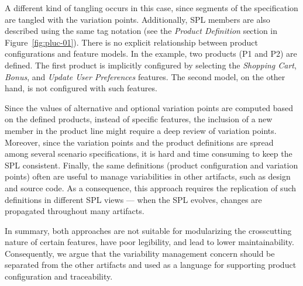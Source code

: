 \documentclass{report}
\begin{document}
\begin{frontmatter}
\begin{figure}[h]
\end{figure}

A different kind of tangling occurs in this case, since segments of the
specification are tangled with the variation points. Additionally, SPL members
are also described using the same tag notation (see the \emph{Product Definition}
section in Figure~\ref{fig:pluc-01}). There is no explicit relationship between
product configurations and feature models. In the example, two products (P1 and
P2) are defined. The first product is implicitly configured by selecting the
\emph{Shopping Cart}, \emph{Bonus}, and \emph{Update User Preferences} features.
The second model, on the other hand, is not configured with such features.

Since the values of alternative and optional variation points are computed based
on the defined products, instead of specific features, the inclusion of a new
member in the product line might require a deep review of variation points.
Moreover, since the variation points and the product definitions are spread among
several scenario specifications, it is hard and time consuming to keep the SPL
consistent. Finally, the same definitions (product configuration and variation
points) often are useful to manage variabilities in other artifacts, such as
design and source code. As a consequence, this approach requires the replication
of such definitions in different SPL views --- when the SPL evolves, changes are
propagated throughout many artifacts.

In summary, both approaches are not suitable for modularizing the crosscutting
nature of certain features, have poor legibility, and lead to lower
maintainability. Consequently, we argue that the variability
management concern should be separated from the other artifacts and used as a
language for supporting product configuration and traceability. 



\end{frontmatter}
\end{document}
